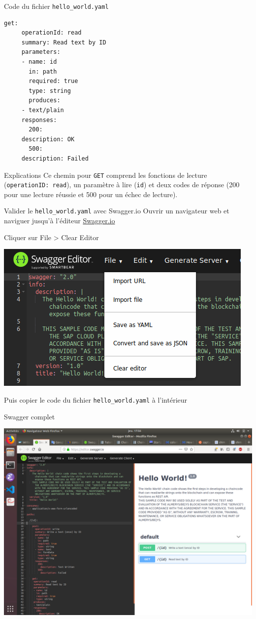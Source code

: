 \documentclass[presentation]{beamer}
\begin{document}
\begin{frame}[fragile,label={sec:org8f6c452}]{Code du fichier \texttt{hello\_world.yaml}}
 \begin{verbatim}
get:
     operationId: read
     summary: Read text by ID
     parameters:
     - name: id
       in: path
       required: true
       type: string
       produces:
     - text/plain
     responses:
       200:
	 description: OK
       500:
	 description: Failed
\end{verbatim}
\end{frame}
\begin{frame}[fragile,label={sec:orge9b4988}]{Explications}
 Ce chemin pour \texttt{GET} comprend les fonctions de lecture (\texttt{operationID: read}), 
un paramètre à lire (\texttt{id}) et deux codes de réponse (200 pour une lecture 
réussie et 500 pour un échec de lecture).
\end{frame}
\begin{frame}[fragile,label={sec:org91c28db}]{Valider le \texttt{hello\_world.yaml} avec Swagger.io}
 Ouvrir un navigateur web et naviguer jusqu'à l'éditeur \href{https://editor.swagger.io/}{Swagger.io}

Cliquer sur File > Clear Editor

\begin{center}
\includegraphics[width=.9\linewidth]{./swagger_file_clear.png}
\end{center}

Puis copier le code du fichier \texttt{hello\_world.yaml} à l'intérieur
\end{frame}

\begin{frame}[label={sec:orgcbbe311}]{Swagger complet}
\begin{center}
\includegraphics[width=.9\linewidth]{./swagger_complete.png}
\end{center}
\end{frame}
\end{document}
